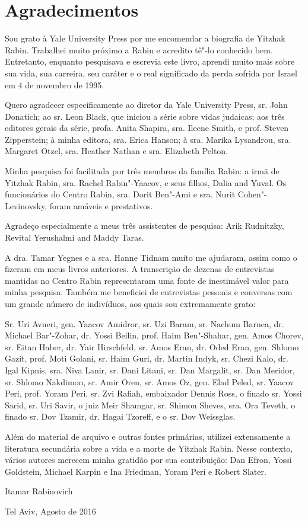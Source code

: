 \chapter{Agradecimentos}

Sou grato à Yale University Press por me encomendar a biografia de
Yitzhak Rabin. Trabalhei muito próximo a Rabin e acredito tê"-lo
conhecido bem. Entretanto, enquanto pesquisava e escrevia este livro,
aprendi muito mais sobre sua vida, sua carreira, seu caráter e o real
significado da perda sofrida por Israel em 4 de novembro de 1995.

Quero agradecer especificamente ao diretor da Yale University Press, sr.
John Donatich; ao sr. Leon Black, que iniciou a série sobre vidas
judaicas; aos três editores gerais da série, profa. Anita 
Shapira, sra. Ileene Smith, e prof. Steven Zipperstein; à minha editora,
sra. Erica Hanson; à sra. Marika Lysandrou, sra. Margaret Otzel, sra.
Heather Nathan e sra. Elizabeth Pelton.

Minha pesquisa foi facilitada por três membros da família Rabin: 
a irmã de Yitzhak Rabin, sra. Rachel Rabin"-Yaacov, e seus filhos, Dalia
and Yuval. Os funcionários do Centro Rabin, 
sra. Dorit Ben"-Ami e sra. Nurit Cohen"-Levinovsky, foram amáveis e
prestativos.

Agradeço especialmente a meus três assistentes de pesquisa: Arik
Rudnitzky, Revital Yerushalmi and Maddy Taras.

A dra. Tamar Yegnes e a sra. Hanne Tidnam muito me ajudaram, assim como
o fizeram em meus livros anteriores. A transcrição de dezenas de
entrevistas mantidas no Centro Rabin representaram uma fonte de
inestimável valor para minha pesquisa. Também me beneficiei de
entrevistas pessoais e conversas com um grande número de indivíduos, aos
quais sou extremamente grato:

Sr. Uri Avneri, gen. Yaacov Amidror, sr. Uzi Baram, sr. Nachum Barnea,
dr. Michael Bar"-Zohar, dr. Yossi Beilin, prof. Haim Ben"-Shahar, gen.
Amos Chorev, sr. Eitan Haber, dr. Yair Hirschfeld, sr. Amos Eran, dr.
Oded Eran, gen. Shlomo Gazit, prof. Moti Golani, sr. Haim Guri, dr.
Martin Indyk, sr. Chezi Kalo, dr. Igal Kipnis, sra. Niva Lanir, sr. Dani
Litani, sr. Dan Margalit, sr. Dan Meridor, sr. Shlomo Nakdimon, sr. Amir
Oren, sr. Amos Oz, gen. Elad Peled, sr. Yaacov Peri, prof. Yoram Peri,
sr. Zvi Rafiah, embaixador Dennis Ross, o finado sr. Yossi Sarid, sr.
Uri Savir, o juiz Meir Shamgar, sr. Shimon Sheves, sra. Ora Teveth, o
finado sr. Dov Tzamir, dr. Hagai Tzoreff, e o sr. Dov Weissglas.

Além do material de arquivo e outras fontes primárias, utilizei
extensamente a literatura secundária sobre a vida e a morte de Yitzhak
Rabin. Nesse contexto, vários autores merecem minha gratidão por sua
contribuição: Dan Efron, Yossi Goldstein, Michael Karpin e Ina Friedman,
Yoram Peri e Robert Slater.

\bigskip

\hfill{}Itamar Rabinovich

\hfill{}Tel Aviv, Agosto de 2016

